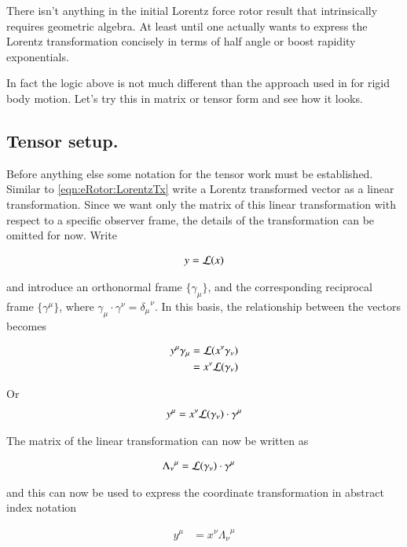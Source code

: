 There isn't anything in the initial Lorentz force rotor result that intrinsically requires geometric algebra.  At least until
one actually
wants to express the Lorentz transformation concisely in terms of half angle or boost rapidity exponentials.

In fact
the logic above is not much different than the approach used in \cite{TongDynamics} for rigid body motion.  Let's try this in matrix or tensor
form and see how it looks.

\subsection{Tensor setup. }

Before anything else some notation for the tensor work must be established.  Similar to \ref{eqn:eRotor:LorentzTx} write a Lorentz transformed vector as a 
linear transformation.  Since we want only the matrix of this linear transformation with respect to a specific observer frame, the details
of the transformation can be omitted for now.  Write

\begin{align}
y = \mathcal{L}(x)
\end{align}

and introduce an orthonormal frame $\{\gamma_\mu\}$, and the corresponding reciprocal frame
$\{\gamma^\mu\}$, where $\gamma_\mu \cdot \gamma^\nu = {\delta_\mu}^\nu$.
In this basis, the relationship between the vectors becomes

\begin{align*}
y^\mu \gamma_\mu 
&= \mathcal{L}(x^\nu \gamma_\nu) \\
&= x^\nu \mathcal{L}(\gamma_\nu) \\
\end{align*}

Or
\begin{align*}
y^\mu &= x^\nu \mathcal{L}(\gamma_\nu) \cdot \gamma^\mu \\
\end{align*}

The matrix of the linear transformation can now be written as

\begin{align}
{\Lambda_\nu}^\mu &= \mathcal{L}(\gamma_\nu) \cdot \gamma^\mu
\end{align}

and this can now be used to express the coordinate transformation in abstract index notation

\begin{align}
y^\mu &= x^\nu {\Lambda_\nu}^\mu 
\end{align}

